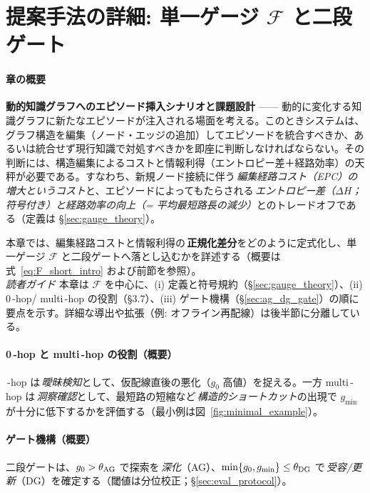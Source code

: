 \documentclass[ja=standard,xelatex]{bxjsarticle}
\newcommand{\F}{\mathcal{F}}
\begin{document}
\section{提案手法の詳細: 単一ゲージ \texorpdfstring{$\F$}{F} と二段ゲート}


\paragraph{章の概要}\; \textbf{動的知識グラフへのエピソード挿入シナリオと課題設計} —— 動的に変化する知識グラフに新たなエピソードが注入される場面を考える。このときシステムは、グラフ構造を編集（ノード・エッジの追加）してエピソードを統合すべきか、あるいは統合せず現行知識で対処すべきかを即座に判断しなければならない。その判断には、構造編集によるコストと情報利得（エントロピー差＋経路効率）の天秤が必要である。すなわち、新規ノード接続に伴う\,\emph{編集経路コスト（EPC）の増大というコスト}と、エピソードによってもたらされる\,\emph{エントロピー差（$\Delta H$；符号付き）と経路効率の向上（= 平均最短路長の減少）}とのトレードオフである（定義は \S\ref{sec:gauge_theory}）。

本章では、編集経路コストと情報利得の\,\textbf{正規化差分}をどのように定式化し、単一ゲージ $\F$ と二段ゲートへ落とし込むかを詳述する（概要は式~\eqref{eq:F_short_intro} および前節を参照）。
\\
\noindent\textit{読者ガイド}\; 本章は $\F$ を中心に、(i) 定義と符号規約（\S\ref{sec:gauge_theory}）、(ii) 0\,\mbox{-}hop/ multi\,\mbox{-}hop の役割（§3.7）、(iii) ゲート機構（§\ref{sec:ag_dg_gate}）の順に要点を示す。詳細な導出や拡張（例: オフライン再配線）は後半節に分離している。

\paragraph{0\,\mbox{-}hop と multi\,\mbox{-}hop の役割（概要）}\,\mbox{-}hop は\,\emph{曖昧検知}として、仮配線直後の悪化（$g_0$ 高値）を捉える。一方 multi\,\mbox{-}hop は\,\emph{洞察確認}として、最短路の短縮など\,\emph{構造的ショートカット}の出現で $g_{\min}$ が十分に低下するかを評価する（最小例は図~\ref{fig:minimal_example}）。

\paragraph{ゲート機構（概要）}\; 二段ゲートは、$g_0>\theta_{\rm AG}$ で探索を\,\emph{深化}（AG）、$\min\{g_0,g_{\min}\}\le\theta_{\rm DG}$ で\,\emph{受容/更新}（DG）を確定する（閾値は分位校正；§\ref{sec:eval_protocol}）。
\end{document}
